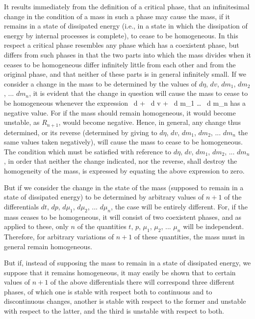 \documentclass[12pt]{memoir}
\begin{document}
It results immediately from the definition of a critical phase, that an infinitesimal change in the condition of a mass in such a phase may cause the mass, if it remains in a state of dissipated energy (i.e., in a state in which the dissipation of energy by internal processes is complete), to cease to be homogeneous. In this respect a critical phase resembles any phase which has a coexistent phase, but differs from such phases in that the two parts into which the mass divides when it ceases to be homogeneous differ infinitely little from each other and from the original phase, and that neither of these parts is in general infinitely small. If we consider a change in the mass to be determined by the values of $d \eta$, $dv$, $dm_1$, $dm_2$, ... $dm_n$, it is evident that the change in question will cause the mass to cease to be homogeneous whenever the expression
\eqs {} \, d \eta +  \, d v +  \, d m_1 \dots {} \, d m_n
\label{209}\eqe
has a negative value. For if the mass should remain homogeneous, it would become unstable, as $R_{n+1}$, would become negative. Hence, in general, any change thus determined, or its reverse (determined by giving to $d \eta$, $dv$, $dm_1$, $dm_2$, ... $dm_n$ the same values taken negatively), will cause the mass to cease to be homogeneous. The condition which must be satisfied with reference to $d \eta$, $dv$, $dm_1$, $dm_2$, ... $dm_n$, in order that neither the change indicated, nor the reverse, shall destroy the homogeneity of the mass, is expressed by equating the above expression to zero.


But if we consider the change in the state of the mass (supposed to remain in a state of dissipated energy) to be determined by arbitrary values of $n +1$ of the differentials $dt$, $dp$, $d\mu_1$, $d\mu_2$, ... $d\mu_n$, the case will be entirely different. For, if the mass ceases to be homogeneous, it will consist of two coexistent phases, and as applied to these, only $n$ of the quantities $t$, $p$, $\mu_1$, $\mu_2$, ... $\mu_n$ will be independent. Therefore, for arbitrary variations of $n+1$ of these quantities, the mass must in general remain homogeneous.


But if, instead of supposing the mass to remain in a state of dissipated energy, we suppose that it remains homogeneous, it may easily be shown that to certain values of $n+1$ of the above differentials there will correspond three different phases, of which one is stable with respect both to continuous and to discontinuous changes, another is stable with respect to the former and unstable with respect to the latter, and the third is unstable with respect to both.
\end{document}
